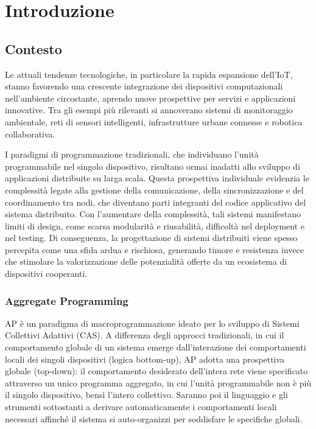 \chapter{Introduzione}
\label{chap:introduzione}


\section{Contesto}
\label{sec:contesto}

Le attuali tendenze tecnologiche, in particolare la rapida espansione dell'\ac{IoT}, stanno favorendo una crescente integrazione dei dispositivi computazionali nell'ambiente circostante, aprendo nuove prospettive per servizi e applicazioni innovative.
%
Tra gli esempi più rilevanti si annoverano sistemi di monitoraggio ambientale, reti di sensori intelligenti, infrastrutture urbane connesse e robotica collaborativa.

I paradigmi di programmazione tradizionali, che individuano l'unità programmabile nel singolo dispositivo, risultano ormai inadatti allo sviluppo di applicazioni distribuite su larga scala.
%
Questa prospettiva individuale evidenzia le complessità legate alla gestione della comunicazione, della sincronizzazione e del coordinamento tra nodi, che diventano parti integranti del codice applicativo del sistema distribuito.
%
Con l'aumentare della complessità, tali sistemi manifestano limiti di design, come scarsa modularità e riusabilità, difficoltà nel deployment e nel testing.
%
Di conseguenza, la progettazione di sistemi distribuiti viene spesso percepita come una sfida ardua e rischiosa, generando timore e resistenza invece che stimolare la valorizzazione delle potenzialità offerte da un ecosistema di dispositivi cooperanti.



\subsection{Aggregate Programming}
\label{sec:programmazioneaggregata}

\ac{AP} \cite{AC} è un paradigma di macroprogrammazione \cite{macroprogramming} ideato per lo sviluppo di Sistemi Collettivi Adattivi (CAS). 
%
A differenza degli approcci tradizionali, in cui il comportamento globale di un sistema emerge dall’interazione dei comportamenti locali dei singoli dispositivi (logica bottom-up), \ac{AP} adotta una prospettiva globale (top-down): il comportamento desiderato dell’intera rete viene specificato attraverso un unico programma aggregato, in cui l’unità programmabile non è più il singolo dispositivo, bensì l’intero collettivo.
%
Saranno poi il linguaggio e gli strumenti sottostanti a derivare automaticamente i comportamenti locali necessari affinché il sistema si auto-organizzi per soddisfare le specifiche globali.

